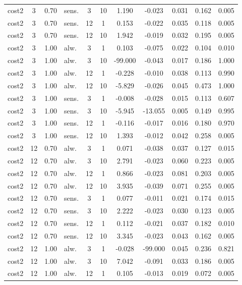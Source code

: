 \documentclass[10pt]{article}
\begin{document}
\begin{scriptsize}
\begin{longtable}{l cclcc ccccc}
cost2 & 3 & 0.70 & sens. & 3 & 10 & 1.190 & -0.023 & 0.031 & 0.162 & 0.005 \\
cost2 & 3 & 0.70 & sens. & 12 & 1 & 0.153 & -0.022 & 0.035 & 0.118 & 0.005 \\
cost2 & 3 & 0.70 & sens. & 12 & 10 & 1.942 & -0.019 & 0.032 & 0.195 & 0.005 \\
cost2 & 3 & 1.00 & alw. & 3 & 1 & 0.103 & -0.075 & 0.022 & 0.104 & 0.010 \\
cost2 & 3 & 1.00 & alw. & 3 & 10 & -99.000 & -0.043 & 0.017 & 0.186 & 1.000 \\
cost2 & 3 & 1.00 & alw. & 12 & 1 & -0.228 & -0.010 & 0.038 & 0.113 & 0.990 \\
cost2 & 3 & 1.00 & alw. & 12 & 10 & -5.829 & -0.026 & 0.045 & 0.473 & 1.000 \\
cost2 & 3 & 1.00 & sens. & 3 & 1 & -0.008 & -0.028 & 0.015 & 0.113 & 0.607 \\
cost2 & 3 & 1.00 & sens. & 3 & 10 & -5.945 & -13.055 & 0.005 & 0.149 & 0.995 \\
cost2 & 3 & 1.00 & sens. & 12 & 1 & -0.116 & -0.017 & 0.016 & 0.180 & 0.970 \\
cost2 & 3 & 1.00 & sens. & 12 & 10 & 1.393 & -0.012 & 0.042 & 0.258 & 0.005 \\
cost2 & 12 & 0.70 & alw. & 3 & 1 & 0.071 & -0.038 & 0.037 & 0.127 & 0.015 \\
cost2 & 12 & 0.70 & alw. & 3 & 10 & 2.791 & -0.023 & 0.060 & 0.223 & 0.005 \\
cost2 & 12 & 0.70 & alw. & 12 & 1 & 0.866 & -0.023 & 0.081 & 0.203 & 0.005 \\
cost2 & 12 & 0.70 & alw. & 12 & 10 & 3.935 & -0.039 & 0.071 & 0.255 & 0.005 \\
cost2 & 12 & 0.70 & sens. & 3 & 1 & 0.077 & -0.011 & 0.021 & 0.174 & 0.015 \\
cost2 & 12 & 0.70 & sens. & 3 & 10 & 2.222 & -0.023 & 0.030 & 0.123 & 0.005 \\
cost2 & 12 & 0.70 & sens. & 12 & 1 & 0.112 & -0.021 & 0.037 & 0.182 & 0.010 \\
cost2 & 12 & 0.70 & sens. & 12 & 10 & 3.345 & -0.023 & 0.043 & 0.162 & 0.005 \\
cost2 & 12 & 1.00 & alw. & 3 & 1 & -0.028 & -99.000 & 0.045 & 0.236 & 0.821 \\
cost2 & 12 & 1.00 & alw. & 3 & 10 & 7.042 & -0.091 & 0.033 & 0.186 & 0.005 \\
cost2 & 12 & 1.00 & alw. & 12 & 1 & 0.105 & -0.013 & 0.019 & 0.072 & 0.005 \\

\end{longtable}
\end{scriptsize}
\end{document}

